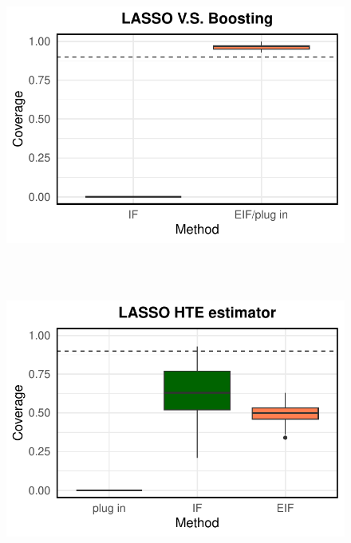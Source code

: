 \documentclass[twoside]{article}
\newcommand{\1}{{\mathbbm{1}}}
\begin{document}
\begin{figure}[ht]
\begin{minipage}{0.15\textwidth}
                \includegraphics[clip, trim = 0cm 0cm 0cm 0cm, width = \textwidth]{plot/simulation_true_coverage_LASSO_V.S._Boosting.pdf}
        \end{minipage}       
        \\  \\          
        \begin{minipage}{0.15\textwidth}
                \centering
                \includegraphics[clip, trim = 0cm 0cm 0cm 0cm, width = \textwidth]{plot/simulation_linear_coverage_LASSO.pdf}
        \end{minipage}
        \begin{minipage}{0.15\textwidth}
                \centering

\end{minipage}
\end{figure}
\end{document}
